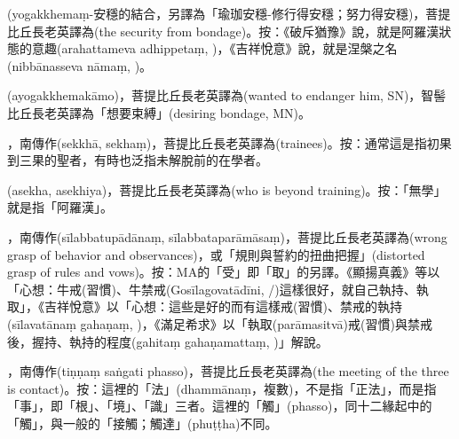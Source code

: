 \startitemgroup[noteitems]
\item{}(yogakkhemaṃ-安穩的結合，另譯為「瑜珈安穩-修行得安穩；努力得安穩)，菩提比丘長老英譯為(the security from bondage)。按：《破斥猶豫》說，就是阿羅漢狀態的意趣(arahattameva adhippetaṃ, )，《吉祥悅意》說，就是涅槃之名(nibbānasseva nāmaṃ, )。
\item{}(ayogakkhemakāmo)，菩提比丘長老英譯為(wanted to endanger him, SN)，智髻比丘長老英譯為「想要束縛」(desiring bondage, MN)。
\stopitemgroup

\startitemgroup[noteitems]
\item{}，南傳作(sekkhā, sekhaṃ)，菩提比丘長老英譯為(trainees)。按：通常這是指初果到三果的聖者，有時也泛指未解脫前的在學者。
\item{}(asekha, asekhiya)，菩提比丘長老英譯為(who is beyond training)。按：「無學」就是指「阿羅漢」。
\stopitemgroup

\startitemgroup[noteitems]
\item{}，南傳作(sīlabbatupādānaṃ, sīlabbataparāmāsaṃ)，菩提比丘長老英譯為(wrong grasp of behavior and observances)，或「規則與誓約的扭曲把握」(distorted grasp of rules and vows)。按：MA的「受」即「取」的另譯。《顯揚真義》等以「心想：牛戒(習慣)、牛禁戒(Gosīlagovatādīni, /)這樣很好，就自己執持、執取」，《吉祥悅意》以「心想：這些是好的而有這樣戒(習慣)、禁戒的執持(sīlavatānaṃ gahaṇaṃ, )，《滿足希求》以「執取(parāmasitvā)戒(習慣)與禁戒後，握持、執持的程度(gahitaṃ gahaṇamattaṃ, )」解說。
\stopitemgroup

\startitemgroup[noteitems]
\item{}，南傳作(tiṇṇaṃ saṅgati phasso)，菩提比丘長老英譯為(the meeting of the three is contact)。按：這裡的「法」(dhammānaṃ，複數)，不是指「正法」，而是指「事」，即「根」、「境」、「識」三者。這裡的「觸」(phasso)，同十二緣起中的「觸」，與一般的「接觸；觸達」(phuṭṭha)不同。
\stopitemgroup

